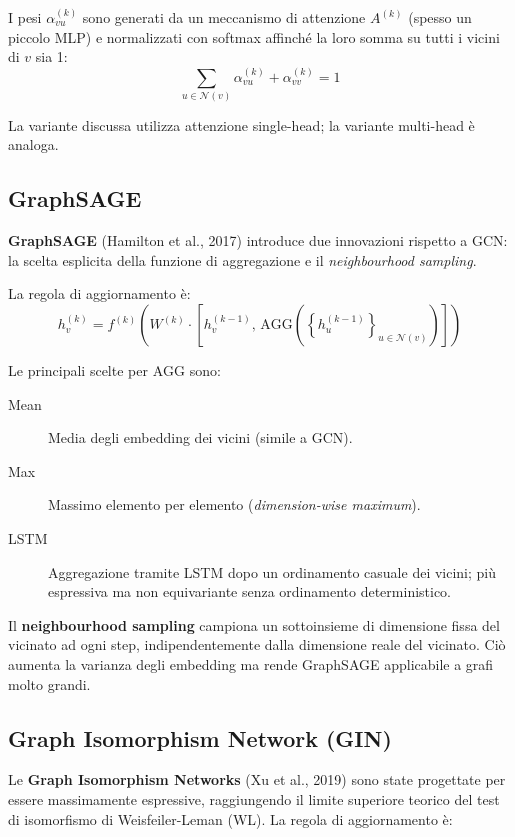 I pesi $\alpha_{vu}^{(k)}$ sono generati da un meccanismo di
attenzione $A^{(k)}$ (spesso un piccolo MLP) e normalizzati con
softmax affinché la loro somma su tutti i vicini di $v$ sia 1:
\begin{equation}
  \sum_{u \in \mathcal{N}(v)} \alpha_{vu}^{(k)} + \alpha_{vv}^{(k)} = 1
  \label{eq:gat-norm}
\end{equation}

La variante discussa utilizza attenzione single-head; la variante
multi-head è analoga.

\subsection{GraphSAGE}
\label{subsec:graphsage}

\textbf{GraphSAGE} (Hamilton et al., 2017) introduce due innovazioni
rispetto a GCN: la scelta esplicita della funzione di aggregazione
e il \emph{neighbourhood sampling}.

La regola di aggiornamento è:
\begin{equation}
  h_v^{(k)} = f^{(k)}\!\left(
    W^{(k)} \cdot \left[h_v^{(k-1)},\, \text{AGG}\!\left(\left\{h_u^{(k-1)}\right\}_{u \in \mathcal{N}(v)}\right)\right]
  \right)
  \label{eq:graphsage}
\end{equation}

Le principali scelte per $\text{AGG}$ sono:
\begin{description}
  \item[Mean] Media degli embedding dei vicini (simile a GCN).
  \item[Max] Massimo elemento per elemento
        (\emph{dimension-wise maximum}).
  \item[LSTM] Aggregazione tramite LSTM dopo un ordinamento casuale
        dei vicini; più espressiva ma non equivariante senza
        ordinamento deterministico.
\end{description}

Il \textbf{neighbourhood sampling} campiona un sottoinsieme di
dimensione fissa del vicinato ad ogni step, indipendentemente
dalla dimensione reale del vicinato. Ciò aumenta la varianza degli
embedding ma rende GraphSAGE applicabile a grafi molto grandi.

\subsection{Graph Isomorphism Network (GIN)}
\label{subsec:gin}

Le \textbf{Graph Isomorphism Networks} (Xu et al., 2019) sono
state progettate per essere massimamente espressive, raggiungendo
il limite superiore teorico del test di isomorfismo
di Weisfeiler-Leman (WL). La regola di aggiornamento è:

